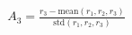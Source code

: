 \documentclass[preview]{standalone}
\begin{document}
\begin{align*}
A_3 = \frac{r_3 - \text{mean}\left({r_1, r_2, r_3}\right)}{\text{std}\left({r_1, r_2, r_3}\right)}
\end{align*}
\end{document}
